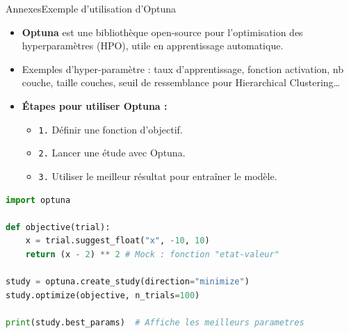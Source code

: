 \begin{frame}[fragile]{Annexes}{Exemple d'utilisation d'Optuna}
    \begin{itemize}
        \item \textbf{Optuna} est une bibliothèque open-source pour l'optimisation des hyperparamètres (HPO), utile en apprentissage automatique.
        \item Exemples d'hyper-paramètre : taux d'apprentissage, fonction activation, nb couche, taille couches, seuil de ressemblance pour Hierarchical Clustering\dots
        \item \textbf{Étapes pour utiliser Optuna :}
        \begin{itemize}
            \item \texttt{1.} Définir une fonction d'objectif.
            \item \texttt{2.} Lancer une étude avec Optuna.
            \item \texttt{3.} Utiliser le meilleur résultat pour entraîner le modèle.
        \end{itemize}
    \end{itemize}

    \begin{lstlisting}[language=Python, basicstyle=\small\ttfamily, frame=single, caption=Exemple d'Optuna en Python]
import optuna

def objective(trial):
    x = trial.suggest_float("x", -10, 10)
    return (x - 2) ** 2 # Mock : fonction "etat-valeur"

study = optuna.create_study(direction="minimize")
study.optimize(objective, n_trials=100)

print(study.best_params)  # Affiche les meilleurs parametres
    \end{lstlisting}
\end{frame}



